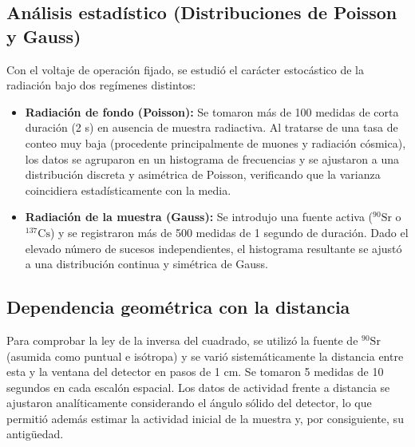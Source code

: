 \documentclass[9pt,a4paper,twocolumn,twoside]{rho-class/rho}
\begin{document}
\subsection{Análisis estadístico (Distribuciones de Poisson y Gauss)}
Con el voltaje de operación fijado, se estudió el carácter estocástico de la radiación bajo dos regímenes distintos:
\begin{itemize}
    \item \textbf{Radiación de fondo (Poisson):} Se tomaron más de 100 medidas de corta duración (2 s) en ausencia de muestra radiactiva. %
    Al tratarse de una tasa de conteo muy baja (procedente principalmente de muones y radiación cósmica), los datos se agruparon en un histograma de frecuencias y se ajustaron a una distribución discreta y asimétrica de Poisson, verificando que la varianza coincidiera estadísticamente con la media. %
    \item \textbf{Radiación de la muestra (Gauss):} Se introdujo una fuente activa ($^{90}\text{Sr}$ o $^{137}\text{Cs}$) y se registraron más de 500 medidas de 1 segundo de duración. %
    Dado el elevado número de sucesos independientes, el histograma resultante se ajustó a una distribución continua y simétrica de Gauss. %
\end{itemize}

\subsection{Dependencia geométrica con la distancia}
Para comprobar la ley de la inversa del cuadrado, se utilizó la fuente de $^{90}\text{Sr}$ (asumida como puntual e isótropa) y se varió sistemáticamente la distancia entre esta y la ventana del detector en pasos de 1 cm. %
Se tomaron 5 medidas de 10 segundos en cada escalón espacial. %
Los datos de actividad frente a distancia se ajustaron analíticamente considerando el ángulo sólido del detector, lo que permitió además estimar la actividad inicial de la muestra y, por consiguiente, su antigüedad. %
\end{document}
